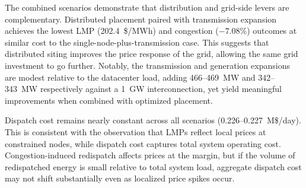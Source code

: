 The combined scenarios demonstrate that distribution and grid-side levers are complementary. Distributed placement paired with transmission expansion achieves the lowest LMP (202.4~\$/MWh) and congestion ($-7.08$\%) outcomes at similar cost to the single-node-plus-transmission case. This suggests that distributed siting improves the price response of the grid, allowing the same grid investment to go further. Notably, the transmission and generation expansions are modest relative to the datacenter load, adding 466--469~MW and 342--343~MW respectively against a 1~GW interconnection, yet yield meaningful improvements when combined with optimized placement.

Dispatch cost remains nearly constant across all scenarios (0.226--0.227~M\$/day). This is consistent with the observation that LMPs reflect local prices at constrained nodes, while dispatch cost captures total system operating cost. Congestion-induced redispatch affects prices at the margin, but if the volume of redispatched energy is small relative to total system load, aggregate dispatch cost may not shift substantially even as localized price spikes occur.



